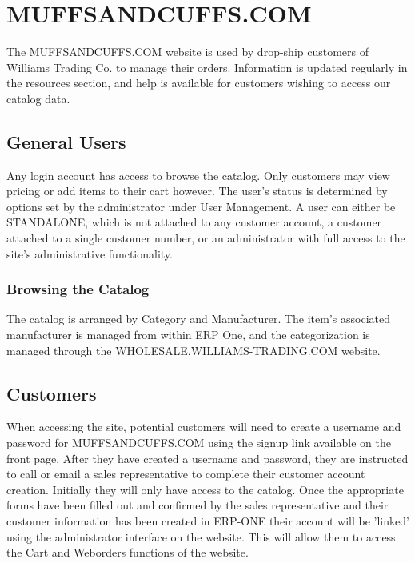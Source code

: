 \section{MUFFSANDCUFFS.COM}

The MUFFSANDCUFFS.COM website is used by drop-ship customers of Williams Trading Co. to manage their orders. Information is updated regularly in the resources section, and help is available for customers wishing to access our catalog data.

\subsection{General Users}

Any login account has access to browse the catalog. Only customers may view pricing or add items to their cart however. The user's status is determined by options set by the administrator under User Management. A user can either be STANDALONE, which is not attached to any customer account, a customer attached to a single customer number, or an administrator with full access to the site's administrative functionality.

\subsubsection{Browsing the Catalog}

The catalog is arranged by Category and Manufacturer. The item's associated manufacturer is managed from within ERP One, and the categorization is managed through the WHOLESALE.WILLIAMS-TRADING.COM website.

\subsection{Customers}

When accessing the site, potential customers will need to create a username and password for MUFFSANDCUFFS.COM using the signup link available on the front page.  After they have created a username and password, they are instructed to call or email a sales representative to complete their customer account creation.  Initially they will only have access to the catalog.  Once the appropriate forms have been filled out and confirmed by the sales representative and their customer information has been created in ERP-ONE their account will be 'linked' using the administrator interface on the website.  This will allow them to access the Cart and Weborders functions of the website.

